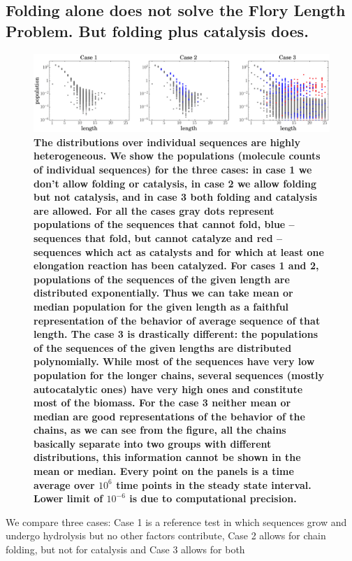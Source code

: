 \documentclass[twocolumn,letterpaper]{revtex4-1}
\begin{document}
\subsection*{Folding alone does not solve the Flory Length Problem.  But folding plus catalysis 
does.}
\begin{figure}[htb!]
  \centering
  \includegraphics[width=\textwidth]{pictures/scatter-all-three.eps}
  \caption{\footnotesize{\textbf{\bf{The distributions over individual sequences are highly 
heterogeneous.}  We show the populations (molecule counts of individual 
sequences) for the three cases: in case 1 we don't allow folding or catalysis, in case 2 
we allow folding but not catalysis, and in case 3 both folding and catalysis are allowed. For 
all the cases gray dots represent populations of the sequences that cannot fold, 
blue -- sequences that fold, but cannot 
catalyze and red -- sequences which act as catalysts and for which at least one elongation 
reaction 
has been catalyzed.  For cases 1 and 2, populations of the sequences of the given length are 
distributed exponentially. Thus we can take mean or median population for the given length as a 
faithful representation of the behavior of average sequence of that length. The case 3 is 
drastically different: the populations of the sequences of the given lengths are distributed 
polynomially. While most of the sequences have very low population for the longer chains, 
several sequences (mostly autocatalytic ones) have very high ones and constitute most of the 
biomass. 
For the case 3 neither mean or median are good representations of the behavior of the chains, 
as we can see from the figure, all the chains basically separate into two groups with different 
distributions, this information cannot be shown in the mean or median.  Every 
point on the panels is a time average over $10^6$ time points in the steady state interval. Lower 
limit of $10^{-6}$ is due to computational precision.}}}
  \label{fig:stats-scatter-018}
\end{figure}
 We compare three cases:  Case 1 is a reference test in which sequences grow and undergo 
hydrolysis 
but no other factors 
contribute, Case 2 allows for chain folding, but not for catalysis and Case 3 allows for both 
\end{document}

